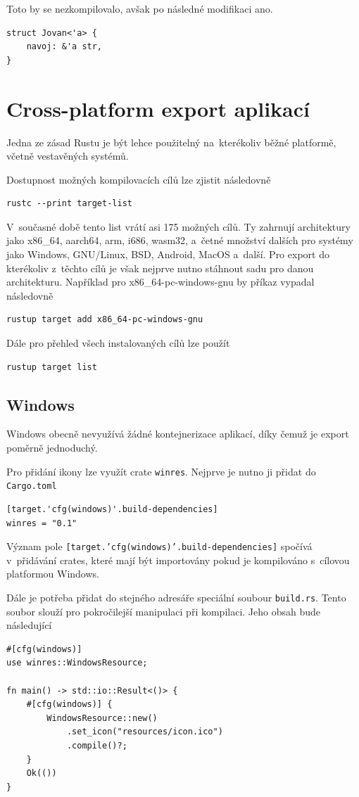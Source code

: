 \documentclass[a4paper, 12pt, twoside]{article} %
\begin{document}
				Toto by se nezkompilovalo, avšak po následné modifikaci ano.
				\begin{verbatim}
struct Jovan<'a> {
	navoj: &'a str,
}
				\end{verbatim}

\section{Cross-platform export aplikací}
	Jedna ze zásad Rustu je být lehce použitelný na~kterékoliv běžné platformě, včetně vestavěných systémů.
	
	Dostupnost možných kompilovacích cílů lze zjistit následovně
	\begin{verbatim}
rustc --print target-list
	\end{verbatim}
		
	V~současné době tento list vrátí asi 175 možných cílů. Ty zahrnují architektury jako x86\_64, aarch64, arm, i686, wasm32, a~četné množství dalších pro systémy jako Windows, GNU/Linux, BSD, Android, MacOS a~další. Pro export do kterékoliv z~těchto cílů je však nejprve nutno stáhnout sadu pro danou architekturu. Například pro x86\_64-pc-windows-gnu by příkaz vypadal následovně
	\begin{verbatim}
rustup target add x86_64-pc-windows-gnu
	\end{verbatim}
	
	Dále pro přehled všech instalovaných cílů lze použít
	\begin{verbatim}
rustup target list
	\end{verbatim}

	\subsection{Windows}
	Windows obecně nevyužívá žádné kontejnerizace aplikací, díky čemuž je export poměrně jednoduchý.
	
		Pro přidání ikony lze využít crate \texttt{winres}. Nejprve je nutno ji přidat do \texttt{Cargo.toml}
		\begin{verbatim}
[target.'cfg(windows)'.build-dependencies]
winres = "0.1"
		\end{verbatim}
		
		Význam pole \texttt{[target.'cfg(windows)'.build-dependencies]} spočívá v~přidávání crates, které mají být importovány pokud je kompilováno s~cílovou platformou Windows.
		
		Dále je potřeba přidat do stejného adresáře speciální soubour \texttt{build.rs}. Tento soubor slouží pro pokročilejší manipulaci při kompilaci. Jeho obsah bude následující
		\begin{verbatim}
#[cfg(windows)]
use winres::WindowsResource;

fn main() -> std::io::Result<()> {
	#[cfg(windows)] {
		WindowsResource::new()
			.set_icon("resources/icon.ico")
			.compile()?;
	}
	Ok(())
}
		\end{verbatim}
\end{document}
